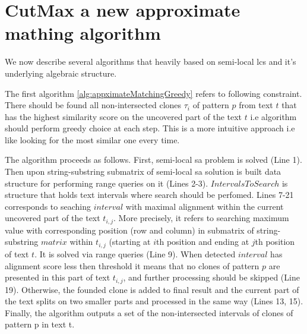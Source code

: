 \section{CutMax a new approximate mathing algorithm}
\label{section:our}
We now describe several algorithms that heavily based on semi-local lcs and it's underlying algebraic structure.

The first algorithm \ref{alg:appximateMatchingGreedy} refers to following constraint.
There should be found all non-intersected clones $\tau_{i}$ of pattern $p$ from text $t$ that has the highest similarity score on the uncovered part of the text $t$ i.e algorithm should perform greedy choice at each step.
This is a more intuitive approach i.e like looking for the most similar one every time. 

The algorithm proceeds as follows.
First, semi-local sa problem is solved (Line 1).
Then upon string-substring submatrix of semi-local sa solution is built data structure for performing range queries on it (Lines 2-3).
$IntervalsToSearch$ is structure that holds text intervals where search should be perfomed.
Lines 7-21 corresponds to seaching $interval$ with maximal alignment within the current uncovered part of the text $t_{i,j}$.
More precisely, it refers to searching maximum value with corresponding position (row and column) in submatrix of string-substring $matrix$ within  $t_{i,j}$ (starting at $i$th position and ending at $j$th position of text $t$.
 It is solved via range queries (Line 9).
When detected $interval$ has alignment score less then threshold it means that no clones of pattern $p$ are presented in this part of text $t_{i,j}$, and further processing should be skipped (Line 19).
Otherwise, the founded clone is added to final result and the current part of the text splits on two smaller parts and processed in the same way (Lines 13, 15).
Finally, the algorithm outputs a set of the non-intersected intervals of clones of pattern p in text t.


